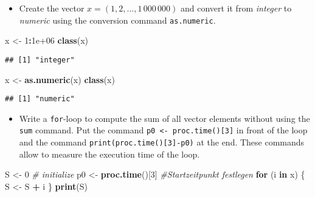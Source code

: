 \documentclass[]{article}
\newenvironment{Shaded}{\begin{snugshade}}{\end{snugshade}}
\newcommand{\KeywordTok}[1]{\textcolor[rgb]{0.13,0.29,0.53}{\textbf{#1}}}
\newcommand{\DecValTok}[1]{\textcolor[rgb]{0.00,0.00,0.81}{#1}}
\newcommand{\FloatTok}[1]{\textcolor[rgb]{0.00,0.00,0.81}{#1}}
\newcommand{\StringTok}[1]{\textcolor[rgb]{0.31,0.60,0.02}{#1}}
\newcommand{\CommentTok}[1]{\textcolor[rgb]{0.56,0.35,0.01}{\textit{#1}}}
\newcommand{\ControlFlowTok}[1]{\textcolor[rgb]{0.13,0.29,0.53}{\textbf{#1}}}
\newcommand{\OperatorTok}[1]{\textcolor[rgb]{0.81,0.36,0.00}{\textbf{#1}}}
\newcommand{\NormalTok}[1]{#1}
\providecommand{\tightlist}{%
  \setlength{\itemsep}{0pt}\setlength{\parskip}{0pt}}
\begin{document}
\begin{itemize}
\tightlist
\item
  Create the vector \(x=(1,2,\ldots ,1\,000\,000)\) and convert it from
  \emph{integer} to \emph{numeric} using the conversion command
  \texttt{as.numeric}.
\end{itemize}

\begin{Shaded}
\begin{Highlighting}[]
\NormalTok{x <-}\StringTok{ }\DecValTok{1}\OperatorTok{:}\FloatTok{1e+06}
\KeywordTok{class}\NormalTok{(x)}
\end{Highlighting}
\end{Shaded}

\begin{verbatim}
## [1] "integer"
\end{verbatim}

\begin{Shaded}
\begin{Highlighting}[]
\NormalTok{x <-}\StringTok{ }\KeywordTok{as.numeric}\NormalTok{(x)}
\KeywordTok{class}\NormalTok{(x)}
\end{Highlighting}
\end{Shaded}

\begin{verbatim}
## [1] "numeric"
\end{verbatim}

\begin{itemize}
\tightlist
\item
  Write a \texttt{for}-loop to compute the sum of all vector elements
  without using the \texttt{sum} command. Put the command
  \texttt{p0\ \textless{}-\ proc.time(){[}3{]}} in front of the loop and
  the command \texttt{print(proc.time(){[}3{]}-p0)} at the end. These
  commands allow to measure the execution time of the loop.
\end{itemize}

\begin{Shaded}
\begin{Highlighting}[]
\NormalTok{S <-}\StringTok{ }\DecValTok{0}  \CommentTok{# initialize}
\NormalTok{p0 <-}\StringTok{ }\KeywordTok{proc.time}\NormalTok{()[}\DecValTok{3}\NormalTok{]  }\CommentTok{#Startzeitpunkt festlegen}
\ControlFlowTok{for}\NormalTok{ (i }\ControlFlowTok{in}\NormalTok{ x) \{}
\NormalTok{    S <-}\StringTok{ }\NormalTok{S }\OperatorTok{+}\StringTok{ }\NormalTok{i}
\NormalTok{\}}
\KeywordTok{print}\NormalTok{(S)}
\end{Highlighting}
\end{Shaded}
\end{document}
